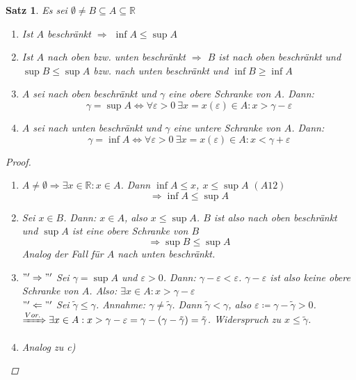 \documentclass{extreport}
\newcommand{\R}{\mathbb{R}}
\theoremstyle{named}
\theoremstyle{dotless}
\newtheorem{satz}[namedtheorem]{Satz}
\begin{document}
\begin{satz} \label{1.2:satz}
	Es sei $\emptyset \neq B \subseteq A \subseteq \R$
	\begin{enumerate}
		\item Ist $A$ beschränkt $\Rightarrow$ $\inf A \leq \sup A$
		\item Ist $A$ nach oben bzw. unten beschränkt $\Rightarrow$ $B$ ist nach oben beschränkt und $\sup B \leq \sup A$ bzw. nach unten beschränkt und $\inf B \geq \inf A$
		\item $A$ sei nach oben beschränkt und $\gamma$ eine obere Schranke von $A$. Dann:
			$$
				\gamma = \sup A \iff \forall \varepsilon > 0 ~\exists x = x(\varepsilon) \in A : x > \gamma - \varepsilon
			$$
		\item $A$ sei nach unten beschränkt und $\gamma$ eine untere Schranke von $A$. Dann:
			$$
				\gamma = \inf A \iff \forall \varepsilon > 0 ~\exists x = x(\varepsilon) \in A : x < \gamma + \varepsilon
			$$	
	\end{enumerate}

	\begin{proof} ~\ 
		\begin{enumerate}
			\item $A \neq \emptyset \Rightarrow \exists x \in \R : x \in A$. Dann $\inf A \leq x$, $x \leq \sup A$ $(A12)$
			$$ \Rightarrow \inf A \leq \sup A $$
			\item Sei $x \in B$. Dann: $x \in A$, also $x \leq \sup A$. $B$ ist also nach oben beschränkt und $\sup A$ ist eine obere Schranke von $B$
			$$ \Rightarrow \sup B \leq \sup A $$
			Analog der Fall für $A$ nach unten beschränkt.
			\item $"'\Rightarrow"'$ Sei $\gamma = \sup A$ und $\varepsilon > 0$. Dann: $\gamma - \varepsilon < \varepsilon$. $\gamma - \varepsilon$ ist also keine obere Schranke von $A$. Also: $\exists x \in A : x > \gamma - \varepsilon$ \\
				$"'\Leftarrow"'$ Sei $\tilde{\gamma} \leq \gamma$. Annahme: $\gamma \neq \tilde{\gamma}$. Dann $\tilde{\gamma} < \gamma$, also $\varepsilon \coloneqq \gamma - \tilde{\gamma} > 0$.\\
				$\xRightarrow[]{Vor.} \exists x \in A: x > \gamma - \varepsilon = \gamma- (\gamma - \tilde{\gamma}) = \tilde{\gamma}$. Widerspruch zu $x \leq \tilde{\gamma}$.
			\item Analog zu c)
		\end{enumerate}
	\end{proof}
\end{satz}
\end{document}

